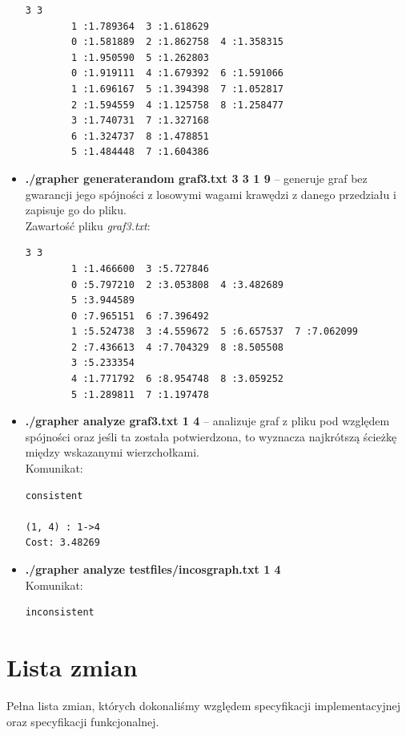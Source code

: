 \documentclass{article}
\begin{document}
\begin{itemize}
\begin{lstlisting}
3 3
        1 :1.789364  3 :1.618629
        0 :1.581889  2 :1.862758  4 :1.358315
        1 :1.950590  5 :1.262803
        0 :1.919111  4 :1.679392  6 :1.591066
        1 :1.696167  5 :1.394398  7 :1.052817
        2 :1.594559  4 :1.125758  8 :1.258477
        3 :1.740731  7 :1.327168
        6 :1.324737  8 :1.478851
        5 :1.484448  7 :1.604386
\end{lstlisting}
\newpage
\item \textbf{./grapher generate\textunderscore random graf3.txt 3 3 1 9} -- generuje graf bez gwarancji jego spójności z losowymi wagami krawędzi z danego przedziału i zapisuje go do pliku.
   \vspace{3mm}
\\
Zawartość pliku \emph{graf3.txt}:
\begin{lstlisting}
3 3
        1 :1.466600  3 :5.727846
        0 :5.797210  2 :3.053808  4 :3.482689
        5 :3.944589
        0 :7.965151  6 :7.396492
        1 :5.524738  3 :4.559672  5 :6.657537  7 :7.062099
        2 :7.436613  4 :7.704329  8 :8.505508
        3 :5.233354
        4 :1.771792  6 :8.954748  8 :3.059252
        5 :1.289811  7 :1.197478
\end{lstlisting}
\item \textbf{./grapher analyze graf3.txt 1 4} -- analizuje graf z pliku pod względem spójności oraz jeśli ta została potwierdzona, to wyznacza najkrótszą ścieżkę między wskazanymi wierzchołkami.
   \vspace{3mm}
\\
Komunikat: 
\begin{lstlisting}
consistent

(1, 4) : 1->4
Cost: 3.48269
\end{lstlisting}
\item \textbf{./grapher analyze test\textunderscore files/incos\textunderscore graph.txt 1 4}
   \vspace{3mm}
\\
Komunikat: 
\begin{lstlisting}
inconsistent

\end{lstlisting}
\end{itemize}

\newpage
\section{Lista zmian}

Pełna lista zmian, których dokonaliśmy względem specyfikacji implementacyjnej oraz specyfikacji funkcjonalnej.
\end{document}
